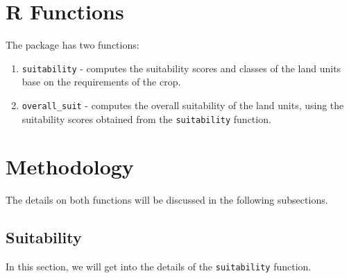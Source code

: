 \documentclass[11pt,fleqn]{article}\usepackage[]{graphicx}\usepackage[]{color}
\begin{document}
\section{R Functions}
The package has two functions:
\begin{enumerate}
\item \verb|suitability| - computes the suitability scores and classes of the land units base on the requirements of the crop.
\item \verb|overall_suit| - computes the overall suitability of the land units, using the suitability scores obtained from the \verb|suitability| function.
\end{enumerate}
\section{Methodology}
The details on both functions will be discussed in the following subsections.
\subsection{Suitability}
In this section, we will get into the details of the \verb|suitability| function.
\end{document}
